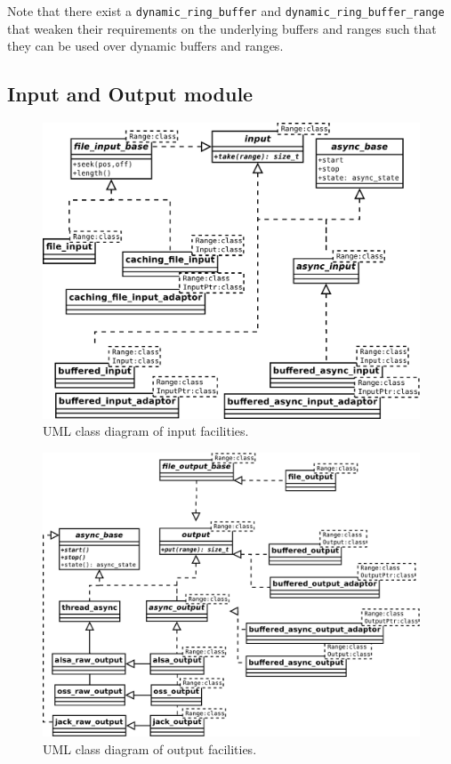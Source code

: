 Note that there exist a \texttt{dynamic\-\_ring\-\_buffer} and
\texttt{dynamic\-\_ring\-\_buffer\-\_range} that weaken their
requirements on the underlying buffers and ranges such that they can
be used over dynamic buffers and ranges.

\subsection{Input and Output module}
\label{sec:ns-io}

\begin{figure}[h]
  \centering
  \includegraphics[width=\textwidth]{pic/io-class-input.pdf}
  \caption{UML class diagram of  input facilities.}
  \label{fig:inputuml}
\end{figure}

\begin{figure}[h]
  \centering
  \includegraphics[width=\textwidth]{pic/io-class-output.pdf}
  \caption{UML class diagram of  output facilities.}
  \label{fig:outputuml}
\end{figure}

